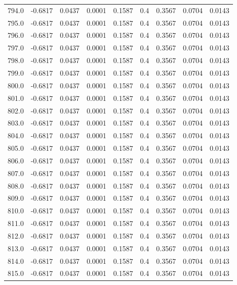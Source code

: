 \begin{longtable}{lrrrrrrrr}
794.0 & -0.6817 & 0.0437 & 0.0001 & 0.1587 & 0.4 & 0.3567 & 0.0704 & 0.0143 \\
795.0 & -0.6817 & 0.0437 & 0.0001 & 0.1587 & 0.4 & 0.3567 & 0.0704 & 0.0143 \\
796.0 & -0.6817 & 0.0437 & 0.0001 & 0.1587 & 0.4 & 0.3567 & 0.0704 & 0.0143 \\
797.0 & -0.6817 & 0.0437 & 0.0001 & 0.1587 & 0.4 & 0.3567 & 0.0704 & 0.0143 \\
798.0 & -0.6817 & 0.0437 & 0.0001 & 0.1587 & 0.4 & 0.3567 & 0.0704 & 0.0143 \\
799.0 & -0.6817 & 0.0437 & 0.0001 & 0.1587 & 0.4 & 0.3567 & 0.0704 & 0.0143 \\
800.0 & -0.6817 & 0.0437 & 0.0001 & 0.1587 & 0.4 & 0.3567 & 0.0704 & 0.0143 \\
801.0 & -0.6817 & 0.0437 & 0.0001 & 0.1587 & 0.4 & 0.3567 & 0.0704 & 0.0143 \\
802.0 & -0.6817 & 0.0437 & 0.0001 & 0.1587 & 0.4 & 0.3567 & 0.0704 & 0.0143 \\
803.0 & -0.6817 & 0.0437 & 0.0001 & 0.1587 & 0.4 & 0.3567 & 0.0704 & 0.0143 \\
804.0 & -0.6817 & 0.0437 & 0.0001 & 0.1587 & 0.4 & 0.3567 & 0.0704 & 0.0143 \\
805.0 & -0.6817 & 0.0437 & 0.0001 & 0.1587 & 0.4 & 0.3567 & 0.0704 & 0.0143 \\
806.0 & -0.6817 & 0.0437 & 0.0001 & 0.1587 & 0.4 & 0.3567 & 0.0704 & 0.0143 \\
807.0 & -0.6817 & 0.0437 & 0.0001 & 0.1587 & 0.4 & 0.3567 & 0.0704 & 0.0143 \\
808.0 & -0.6817 & 0.0437 & 0.0001 & 0.1587 & 0.4 & 0.3567 & 0.0704 & 0.0143 \\
809.0 & -0.6817 & 0.0437 & 0.0001 & 0.1587 & 0.4 & 0.3567 & 0.0704 & 0.0143 \\
810.0 & -0.6817 & 0.0437 & 0.0001 & 0.1587 & 0.4 & 0.3567 & 0.0704 & 0.0143 \\
811.0 & -0.6817 & 0.0437 & 0.0001 & 0.1587 & 0.4 & 0.3567 & 0.0704 & 0.0143 \\
812.0 & -0.6817 & 0.0437 & 0.0001 & 0.1587 & 0.4 & 0.3567 & 0.0704 & 0.0143 \\
813.0 & -0.6817 & 0.0437 & 0.0001 & 0.1587 & 0.4 & 0.3567 & 0.0704 & 0.0143 \\
814.0 & -0.6817 & 0.0437 & 0.0001 & 0.1587 & 0.4 & 0.3567 & 0.0704 & 0.0143 \\
815.0 & -0.6817 & 0.0437 & 0.0001 & 0.1587 & 0.4 & 0.3567 & 0.0704 & 0.0143 \\

\end{longtable}

